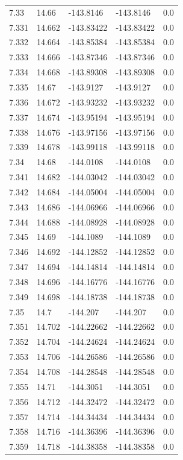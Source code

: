 \begin{tabular}{lllll}
7.33 & 14.66 & -143.8146 & -143.8146 & 0.0 \\
7.331 & 14.662 & -143.83422 & -143.83422 & 0.0 \\
7.332 & 14.664 & -143.85384 & -143.85384 & 0.0 \\
7.333 & 14.666 & -143.87346 & -143.87346 & 0.0 \\
7.334 & 14.668 & -143.89308 & -143.89308 & 0.0 \\
7.335 & 14.67 & -143.9127 & -143.9127 & 0.0 \\
7.336 & 14.672 & -143.93232 & -143.93232 & 0.0 \\
7.337 & 14.674 & -143.95194 & -143.95194 & 0.0 \\
7.338 & 14.676 & -143.97156 & -143.97156 & 0.0 \\
7.339 & 14.678 & -143.99118 & -143.99118 & 0.0 \\
7.34 & 14.68 & -144.0108 & -144.0108 & 0.0 \\
7.341 & 14.682 & -144.03042 & -144.03042 & 0.0 \\
7.342 & 14.684 & -144.05004 & -144.05004 & 0.0 \\
7.343 & 14.686 & -144.06966 & -144.06966 & 0.0 \\
7.344 & 14.688 & -144.08928 & -144.08928 & 0.0 \\
7.345 & 14.69 & -144.1089 & -144.1089 & 0.0 \\
7.346 & 14.692 & -144.12852 & -144.12852 & 0.0 \\
7.347 & 14.694 & -144.14814 & -144.14814 & 0.0 \\
7.348 & 14.696 & -144.16776 & -144.16776 & 0.0 \\
7.349 & 14.698 & -144.18738 & -144.18738 & 0.0 \\
7.35 & 14.7 & -144.207 & -144.207 & 0.0 \\
7.351 & 14.702 & -144.22662 & -144.22662 & 0.0 \\
7.352 & 14.704 & -144.24624 & -144.24624 & 0.0 \\
7.353 & 14.706 & -144.26586 & -144.26586 & 0.0 \\
7.354 & 14.708 & -144.28548 & -144.28548 & 0.0 \\
7.355 & 14.71 & -144.3051 & -144.3051 & 0.0 \\
7.356 & 14.712 & -144.32472 & -144.32472 & 0.0 \\
7.357 & 14.714 & -144.34434 & -144.34434 & 0.0 \\
7.358 & 14.716 & -144.36396 & -144.36396 & 0.0 \\
7.359 & 14.718 & -144.38358 & -144.38358 & 0.0 \\

\end{tabular}
